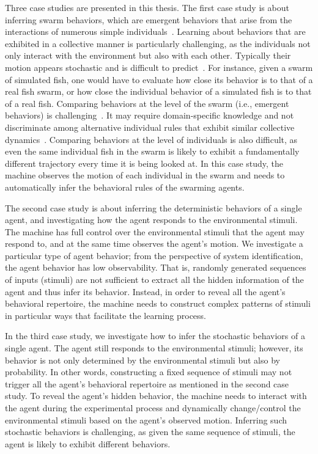 Three case studies are presented in this thesis. The first case study is about inferring swarm behaviors, which are emergent behaviors that arise from the interactions of numerous simple individuals~\cite{Camazine2001}. Learning about behaviors that are exhibited in a collective manner is particularly challenging, as the individuals not only interact with the environment but also with each other. Typically their motion appears stochastic and is difficult to predict~\cite{Dirk2011}. For instance, given a swarm of simulated fish, one would have to evaluate how close its behavior is to that of a real fish swarm, or how close the individual behavior of a simulated fish is to that of a real fish. Comparing behaviors at the level of the swarm (i.e., emergent behaviors) is challenging~\cite{Harvey:SI:2015}. It may require domain-specific knowledge and not discriminate among alternative individual rules that exhibit similar collective dynamics~\cite{Weitz2012}. Comparing behaviors at the level of individuals is also difficult, as even the same individual fish in the swarm is likely to exhibit a fundamentally different trajectory every time it is being looked at. In this case study, the machine observes the motion of each individual in the swarm and needs to automatically infer the behavioral rules of the swarming agents.

The second case study is about inferring the deterministic behaviors of a single agent, and investigating how the agent responds to the environmental stimuli. The machine has full control over the environmental stimuli that the agent may respond to, and at the same time observes the agent's motion. We investigate a particular type of agent behavior; from the perspective of system identification, the agent behavior has low observability. That is, randomly generated sequences of inputs (stimuli) are not sufficient to extract all the hidden information of the agent and thus infer its behavior. Instead, in order to reveal all the agent's behavioral repertoire, the machine needs to construct complex patterns of stimuli in particular ways that facilitate the learning process. 

In the third case study, we investigate how to infer the stochastic behaviors of a single agent. The agent still responds to the environmental stimuli; however, its behavior is not only determined by the environmental stimuli but also by probability. In other words, constructing a fixed sequence of stimuli may not trigger all the agent's behavioral repertoire as mentioned in the second case study. To reveal the agent's hidden behavior, the machine needs to interact with the agent during the experimental process and dynamically change/control the environmental stimuli based on the agent's observed motion. Inferring such stochastic behaviors is challenging, as given the same sequence of stimuli, the agent is likely to exhibit different behaviors. 

